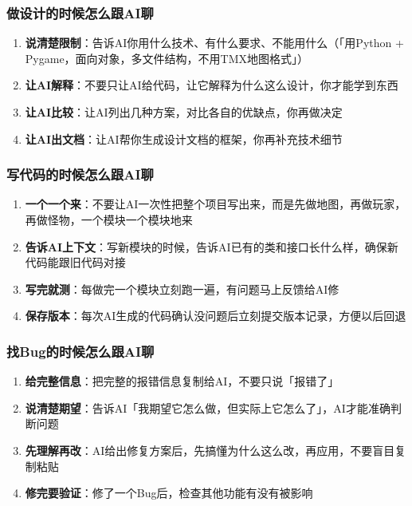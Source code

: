 \documentclass[12pt,a4paper]{article}
\begin{document}
\subsubsection{做设计的时候怎么跟AI聊}

\begin{enumerate}[leftmargin=2em]
    \item \textbf{说清楚限制}：告诉AI你用什么技术、有什么要求、不能用什么（「用Python + Pygame，面向对象，多文件结构，不用TMX地图格式」）
    \item \textbf{让AI解释}：不要只让AI给代码，让它解释为什么这么设计，你才能学到东西
    \item \textbf{让AI比较}：让AI列出几种方案，对比各自的优缺点，你再做决定
    \item \textbf{让AI出文档}：让AI帮你生成设计文档的框架，你再补充技术细节
\end{enumerate}

\subsubsection{写代码的时候怎么跟AI聊}

\begin{enumerate}[leftmargin=2em]
    \item \textbf{一个一个来}：不要让AI一次性把整个项目写出来，而是先做地图，再做玩家，再做怪物，一个模块一个模块地来
    \item \textbf{告诉AI上下文}：写新模块的时候，告诉AI已有的类和接口长什么样，确保新代码能跟旧代码对接
    \item \textbf{写完就测}：每做完一个模块立刻跑一遍，有问题马上反馈给AI修
    \item \textbf{保存版本}：每次AI生成的代码确认没问题后立刻提交版本记录，方便以后回退
\end{enumerate}

\subsubsection{找Bug的时候怎么跟AI聊}

\begin{enumerate}[leftmargin=2em]
    \item \textbf{给完整信息}：把完整的报错信息复制给AI，不要只说「报错了」
    \item \textbf{说清楚期望}：告诉AI「我期望它怎么做，但实际上它怎么了」，AI才能准确判断问题
    \item \textbf{先理解再改}：AI给出修复方案后，先搞懂为什么这么改，再应用，不要盲目复制粘贴
    \item \textbf{修完要验证}：修了一个Bug后，检查其他功能有没有被影响
\end{enumerate}
\end{document}
